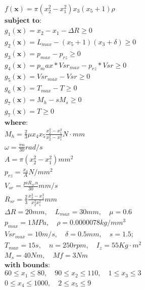 \begin{equation*}
\begin{aligned}
& f(\bm{x}) = \pi(x_2^2 - x_1^2) x_3 (x_5 + 1) \rho \\[0.5em]
& \textbf{subject to:} \\
& g_1(\bm{x}) = x_2 - x_1 - \Delta R \geq 0 \\
& g_2(\bm{x}) = L_{max} - (x_5 + 1) (x_3 + \delta) \geq 0 \\
& g_3(\bm{x}) = p_{max} - p_{rz} \geq 0 \\
& g_4(\bm{x}) = p_max * Vsr_{max} - p_{rz} * Vsr \geq 0 \\
& g_5(\bm{x}) = Vsr_{max} - Vsr \geq 0 \\
& g_6(\bm{x}) = T_{max} - T \geq 0 \\
& g_7(\bm{x}) = M_h - s  M_s \geq 0 \\
& g_7(\bm{x}) = T \geq 0 \\[0.5em]
& \textbf{where:} \\
& M_h = \frac{2}{3} \mu x_4 x_5 \frac{x_2^3 - x_1^3}{x_2^2 - x_1^2} N \cdot mm  \\
& \omega = \frac{\pi n}{30} rad/s  \\
& A = \pi (x_2^2 - x_1^2) mm^2  \\
& p_{rz} = \frac{x_4}{A} N/mm^2 \\
& V_{sr} = \frac{pi R_{sr} n}{30} mm /s \\
& R_{sr} = \frac{2}{3} \frac{x_2^3 - x_1^3}{x_2^2 x_1^2} mm \\
& \Delta R = 20mm, \quad L_{max} = 30mm, \quad \mu = 0.6 \\
& p_{max} = 1MPa, \quad \rho = 0.0000078kg/mm^3 \\
& Vsr_{max} = 10m/s, \quad \delta = 0.5mm, \quad s = 1.5; \\
& T_{max} = 15s, \quad n = 250rpm, \quad I_{z} = 55Kg \cdot m^2 \\
& M_s = 40Nm, \quad Mf = 3Nm \\[0.5em]
& \textbf{with bounds:} \\
& 60 \leq x_1 \leq 80, \quad 90 \leq x_2 \leq 110, \quad 1 \leq x_3 \leq 3 \\
& 0 \leq x_4 \leq 1000, \quad 2 \leq x_5 \leq 9
\end{aligned}
\end{equation*}
